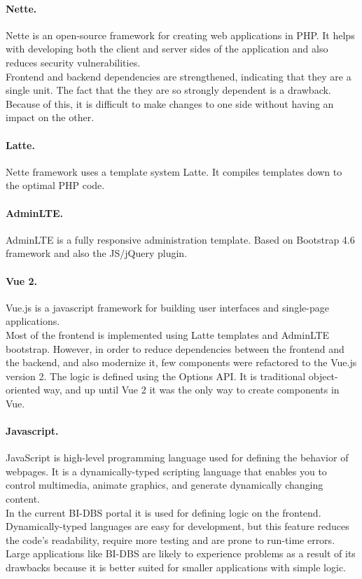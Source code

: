 \paragraph*{Nette.} Nette is an open-source framework for creating web applications in PHP. It helps with developing both the client and server sides of the application and also reduces security vulnerabilities.\\ 
Frontend and backend dependencies are strengthened, indicating that they are a single unit. The fact that the they are so strongly dependent is a drawback. Because of this, it is difficult to make changes to one side without having an impact on the other.

\paragraph*{Latte.} Nette framework uses a template system Latte. It compiles templates down to the optimal PHP code.

\paragraph*{AdminLTE.} AdminLTE is a fully responsive administration template. Based on Bootstrap 4.6 framework and also the JS/jQuery plugin. 

\paragraph*{Vue 2.} Vue.js is a javascript framework for building user interfaces and single-page applications.\\
Most of the frontend is implemented using Latte templates and AdminLTE bootstrap. However, in order to reduce dependencies between the frontend and the backend, and also modernize it, few components were refactored to the Vue.js version 2. The logic is defined using the Options API. It is traditional object-oriented way, and up until Vue 2 it was the only way to create components in Vue.

\paragraph*{Javascript.} JavaScript is high-level programming language used for defining the behavior of webpages. It is a dynamically-typed scripting language that enables you to control multimedia, animate graphics, and generate dynamically changing content.\\ 
In the current BI-DBS portal it is used for defining logic on the frontend. Dynamically-typed languages are easy for development, but this feature reduces the code's readability, require more testing and are prone to run-time errors. Large applications like BI-DBS are likely to experience problems as a result of its drawbacks because it is better suited for smaller applications with simple logic.

